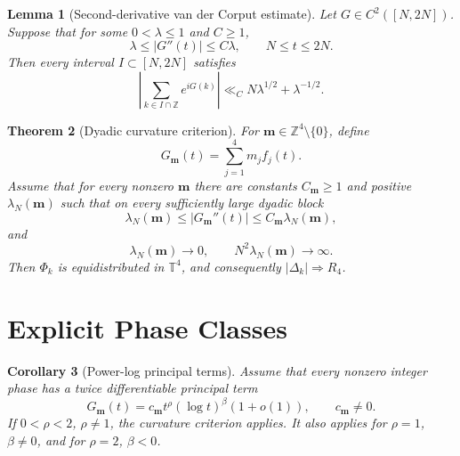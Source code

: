 \documentclass[11pt]{amsart}
\numberwithin{equation}{section}
\theoremstyle{plain}
\newtheorem{theorem}{Theorem}[section]
\newtheorem{lemma}[theorem]{Lemma}
\newtheorem{corollary}[theorem]{Corollary}
\theoremstyle{definition}
\theoremstyle{remark}
\begin{document}
\begin{lemma}[Second-derivative van der Corput estimate]
\label{lem:vdc_second_derivative}
Let \(G\in C^2([N,2N])\). Suppose that for some \(0<\lambda\leq1\) and \(C\geq1\),
\begin{equation}
\lambda\leq |G''(t)|\leq C\lambda,
\qquad N\leq t\leq2N.
\label{eq:vdc_hypothesis}
\end{equation}
Then every interval \(I\subset[N,2N]\) satisfies
\begin{equation}
\left|\sum_{k\in I\cap\mathbb Z}e^{iG(k)}\right|
\ll_C N\lambda^{1/2}+\lambda^{-1/2}.
\label{eq:vdc_bound}
\end{equation}
\end{lemma}

\begin{theorem}[Dyadic curvature criterion]
\label{thm:dyadic_curvature}
For \(\mathbf m\in\mathbb Z^4\setminus\{0\}\), define
\begin{equation}
G_{\mathbf m}(t)=\sum_{j=1}^4m_jf_j(t).
\label{eq:Gm}
\end{equation}
Assume that for every nonzero \(\mathbf m\) there are constants \(C_{\mathbf m}\geq1\) and positive \(\lambda_N(\mathbf m)\) such that on every sufficiently large dyadic block
\begin{equation}
\lambda_N(\mathbf m)\leq|G_{\mathbf m}''(t)|\leq C_{\mathbf m}\lambda_N(\mathbf m),
\label{eq:curvature_bounds}
\end{equation}
and
\begin{equation}
\lambda_N(\mathbf m)\to0,
\qquad N^2\lambda_N(\mathbf m)\to\infty.
\label{eq:curvature_limits}
\end{equation}
Then \(\Phi_k\) is equidistributed in \(\mathbb T^4\), and consequently \(|\Delta_k|\Rightarrow R_4\).
\end{theorem}

\section{Explicit Phase Classes}
\label{sec:explicit_phase_classes}

\begin{corollary}[Power-log principal terms]
\label{cor:power_log}
Assume that every nonzero integer phase has a twice differentiable principal term
\begin{equation}
G_{\mathbf m}(t)=c_{\mathbf m}t^\rho(\log t)^\beta(1+o(1)),
\qquad c_{\mathbf m}\neq0.
\label{eq:power_log_principal}
\end{equation}
If \(0<\rho<2\), \(\rho\neq1\), the curvature criterion applies. It also applies for \(\rho=1\), \(\beta\neq0\), and for \(\rho=2\), \(\beta<0\).
\end{corollary}
\end{document}
